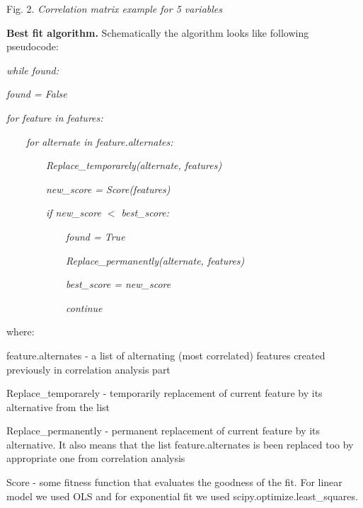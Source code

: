 \documentclass[aps,prl,reprint,amsmath,amssymb,nature]{revtex4-1}
\begin{document}
Fig. 2. \textit{Correlation matrix example for 5 variables}

\textbf{Best fit algorithm.} Schematically the algorithm looks like 
following pseudocode:

\textit{while found:}

\textit{found = False}

\textit{for feature in features:}

\ \ \ \ \textit{for alternate in feature.alternates:}

\ \ \ \ \ \ \ \ \textit{Replace\_temporarely(alternate, features)}

\ \ \ \ \ \ \ \ \textit{new\_score = Score(features)}

\ \ \ \ \ \ \ \ \textit{if new\_score $<$ best\_score:}

\ \ \ \ \ \ \ \ \ \ \ \ \textit{found = True}

\ \ \ \ \ \ \ \ \ \ \ \ \textit{Replace\_permanently(alternate, 
features)}

\ \ \ \ \ \ \ \ \ \ \ \ \textit{best\_score = new\_score}

\ \ \ \ \ \ \ \ \ \ \ \ \textit{continue}

where: 

feature.alternates - a list of alternating (most correlated) features 
created previously in correlation analysis part

Replace\_temporarely - temporarily replacement of current feature by its 
alternative from the list

Replace\_permanently - permanent replacement of current feature by its 
alternative. It also means that the list feature.alternates is been 
replaced too by appropriate one from correlation analysis

Score - some fitness function that evaluates the goodness of the fit. 
For linear model we used OLS and for exponential fit we used 
scipy.optimize.least\_squares.


\fi %
\end{document}
